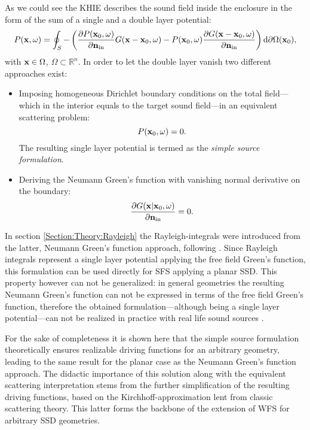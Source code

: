 As we could see the KHIE describes the sound field inside the enclosure in the form of the sum of a single and a double layer potential:
\begin{equation}
P(\mathbf{x},\omega) = 
\oint_{S} - \left( 
\frac{\partial P(\mathbf{x}_0,\omega)}{\partial \mathbf{n}_{\mathrm{in}}} G(\mathbf{x}-\mathbf{x}_0,\omega)
-
P(\mathbf{x}_0,\omega)  \frac{\partial G(\mathbf{x}-\mathbf{x}_0,\omega)}{\partial\mathbf{n}_{\mathrm{in}}} 
\right)   \mathrm{d} \partial \Omega( \mathbf{x}_0),
\end{equation}
with $\mathbf{x} \in \Omega$,  $\Omega \subset \mathbb{R}^n$.
In order to let the double layer vanish two different approaches exist:
\begin{itemize}
\item Imposing homogeneous Dirichlet boundary conditions on the total field---which in the interior equals to the target sound field---in an equivalent scattering problem: 
\begin{equation}
P(\mathbf{x}_0,\omega) = 0.
\end{equation}
The resulting single layer potential is termed as the \emph{simple source formulation}.
\item Deriving the Neumann Green's function with vanishing normal derivative on the boundary:
\begin{equation}
\frac{\partial G(\mathbf{x}|\mathbf{x}_0,\omega)}{\partial \mathbf{n}_{\mathrm{in}}}  = 0.
\end{equation}
\end{itemize}
In section \ref{Section:Theory:Rayleigh} the Rayleigh-integrals were introduced from the latter, Neumann Green's function approach, following \cite{Berkhout1984}. Since Rayleigh integrals represent a single layer potential applying the free field Green's function, this formulation can be used directly for SFS applying a planar SSD. 
This property however can not be generalized: in general geometries the resulting Neumann Green's function can not be expressed in terms of the free field Green's function, therefore the obtained formulation---although being a single layer potential---can not be realized in practice with real life sound sources \cite{Schultz2014:Comparing_approaches}.

For the sake of completeness it is shown here that the simple source formulation theoretically ensures realizable driving functions for an arbitrary geometry, leading to the same result for the planar case as the Neumann Green's function approach. The didactic importance of this solution along with the equivalent scattering interpretation stems from the further simplification of the resulting driving functions, based on the Kirchhoff-approximation lent from classic scattering theory. This latter forms the backbone of the extension of WFS for arbitrary SSD geometries.

